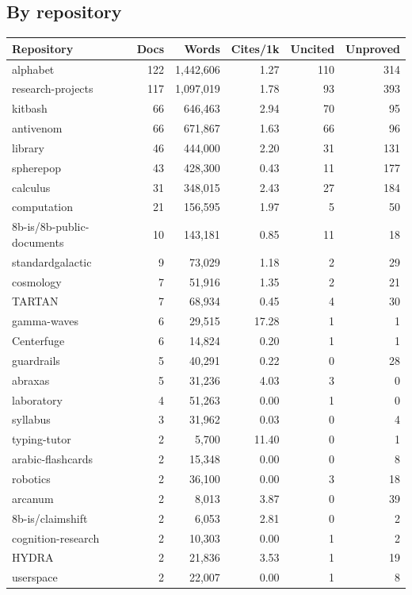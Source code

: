 \documentclass[11pt]{article}
\begin{document}
\subsection*{By repository}
\begin{center}\begin{tabular}{lrrrrr}\toprule
Repository & Docs & Words & Cites/1k & Uncited & Unproved \\\midrule
alphabet & 122 & 1,442,606 & 1.27 & 110 & 314 \\
research-projects & 117 & 1,097,019 & 1.78 & 93 & 393 \\
kitbash & 66 & 646,463 & 2.94 & 70 & 95 \\
antivenom & 66 & 671,867 & 1.63 & 66 & 96 \\
library & 46 & 444,000 & 2.20 & 31 & 131 \\
spherepop & 43 & 428,300 & 0.43 & 11 & 177 \\
calculus & 31 & 348,015 & 2.43 & 27 & 184 \\
computation & 21 & 156,595 & 1.97 & 5 & 50 \\
8b-is/8b-public-documents & 10 & 143,181 & 0.85 & 11 & 18 \\
standardgalactic & 9 & 73,029 & 1.18 & 2 & 29 \\
cosmology & 7 & 51,916 & 1.35 & 2 & 21 \\
TARTAN & 7 & 68,934 & 0.45 & 4 & 30 \\
gamma-waves & 6 & 29,515 & 17.28 & 1 & 1 \\
Centerfuge & 6 & 14,824 & 0.20 & 1 & 1 \\
guardrails & 5 & 40,291 & 0.22 & 0 & 28 \\
abraxas & 5 & 31,236 & 4.03 & 3 & 0 \\
laboratory & 4 & 51,263 & 0.00 & 1 & 0 \\
syllabus & 3 & 31,962 & 0.03 & 0 & 4 \\
typing-tutor & 2 & 5,700 & 11.40 & 0 & 1 \\
arabic-flashcards & 2 & 15,348 & 0.00 & 0 & 8 \\
robotics & 2 & 36,100 & 0.00 & 3 & 18 \\
arcanum & 2 & 8,013 & 3.87 & 0 & 39 \\
8b-is/claimshift & 2 & 6,053 & 2.81 & 0 & 2 \\
cognition-research & 2 & 10,303 & 0.00 & 1 & 2 \\
HYDRA & 2 & 21,836 & 3.53 & 1 & 19 \\
userspace & 2 & 22,007 & 0.00 & 1 & 8 \\

\end{tabular}
\end{center}
\end{document}
